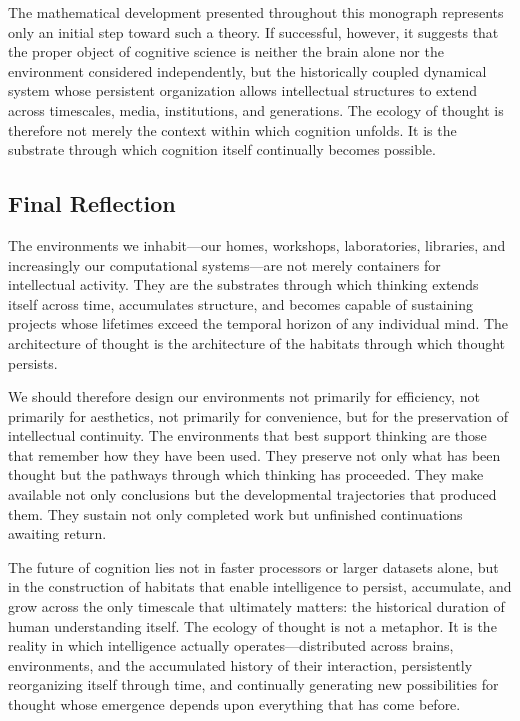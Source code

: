 \documentclass[12pt,oneside]{article}
\theoremstyle{remark}
\begin{document}
The mathematical development presented throughout this monograph represents only an initial step toward such a theory. If successful, however, it suggests that the proper object of cognitive science is neither the brain alone nor the environment considered independently, but the historically coupled dynamical system whose persistent organization allows intellectual structures to extend across timescales, media, institutions, and generations. The ecology of thought is therefore not merely the context within which cognition unfolds. It is the substrate through which cognition itself continually becomes possible.

\subsection{Final Reflection}

The environments we inhabit—our homes, workshops, laboratories, libraries, and increasingly our computational systems—are not merely containers for intellectual activity. They are the substrates through which thinking extends itself across time, accumulates structure, and becomes capable of sustaining projects whose lifetimes exceed the temporal horizon of any individual mind. The architecture of thought is the architecture of the habitats through which thought persists.

We should therefore design our environments not primarily for efficiency, not primarily for aesthetics, not primarily for convenience, but for the preservation of intellectual continuity. The environments that best support thinking are those that remember how they have been used. They preserve not only what has been thought but the pathways through which thinking has proceeded. They make available not only conclusions but the developmental trajectories that produced them. They sustain not only completed work but unfinished continuations awaiting return.

The future of cognition lies not in faster processors or larger datasets alone, but in the construction of habitats that enable intelligence to persist, accumulate, and grow across the only timescale that ultimately matters: the historical duration of human understanding itself. The ecology of thought is not a metaphor. It is the reality in which intelligence actually operates—distributed across brains, environments, and the accumulated history of their interaction, persistently reorganizing itself through time, and continually generating new possibilities for thought whose emergence depends upon everything that has come before.
\end{document}
